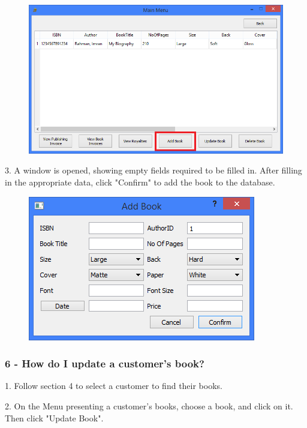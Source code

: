 \begin{figure}[H]
    \includegraphics[width=\textwidth]{./Manual/Tutorial/Q5/AddBook.png}
\end{figure}

3. A window is opened, showing empty fields required to be filled in. After filling in the appropriate data, click "Confirm" to add the book to the database.

\begin{figure}[H]
    \includegraphics[width=\textwidth]{./Manual/Tutorial/Q5/AddBookWindow.png}
\end{figure}

\subsubsection{6 -  How do I update a customer's book?}

1. Follow section 4 to select a customer to find their books.

2. On the Menu presenting a customer's books, choose a book, and click on it. Then click "Update Book".

